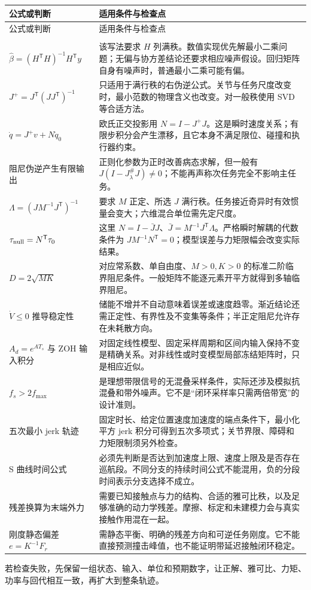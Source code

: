 \begingroup
\small
\begin{longtable}{>{\raggedright\arraybackslash}p{54mm}>{\raggedright\arraybackslash}p{100mm}}
\toprule 公式或判断 & 适用条件与检查点\\\midrule
\endfirsthead
\toprule 公式或判断 & 适用条件与检查点\\\midrule
\endhead
\midrule\multicolumn{2}{r}{接下页}\\\endfoot
\bottomrule\endlastfoot
$\hat\beta=(H^{\mathsf T}H)^{-1}H^{\mathsf T}y$ & 该写法要求 $H$ 列满秩。数值实现优先解最小二乘问题；无偏与协方差结论还要求相应噪声假设。回归矩阵自身有噪声时，普通最小二乘可能有偏。\\
$J^+=J^{\mathsf T}(JJ^{\mathsf T})^{-1}$ & 只适用于满行秩的右伪逆公式。关节与任务尺度改变时，最小范数的物理含义也改变。对一般秩使用 SVD 等合适方法。\\
$\dot q=J^+v+N\dot q_0$ & 欧氏正交投影用 $N=I-J^+J$。这是瞬时速度关系；有限步积分会产生漂移，且它本身不满足限位、碰撞和执行器约束。\\
阻尼伪逆产生有限输出 & 正则化参数为正时改善病态求解，但一般有 $J(I-J_\lambda^\#J)\ne0$；不能再声称次任务完全不影响主任务。\\
$\Lambda=(JM^{-1}J^{\mathsf T})^{-1}$ & 要求 $M$ 正定、所选 $J$ 满行秩。任务接近奇异时有效惯量会变大；六维混合单位需先定尺度。\\
$\tau_{\rm null}=N^{\mathsf T}\tau_0$ & 这里 $N=I-\bar JJ$、$\bar J=M^{-1}J^{\mathsf T}\Lambda$。严格瞬时解耦的代数条件为 $JM^{-1}N^{\mathsf T}=0$；模型误差与力矩限幅会改变实际结果。\\
$D=2\sqrt{MK}$ & 对应常系数、单自由度、$M>0,K>0$ 的标准二阶临界阻尼条件。一般矩阵不能逐元素开平方就得到多轴临界阻尼。\\
$\dot V\le0$ 推导稳定性 & 储能不增并不自动意味着误差或速度趋零。渐近结论还需正定性、有界性及不变集等条件；半正定阻尼允许存在未耗散方向。\\
$A_d=e^{AT_s}$ 与 ZOH 输入积分 & 对固定线性模型、固定采样周期和区间内输入保持不变是精确关系。对非线性或时变模型局部冻结矩阵时，只是相应近似。\\
$f_s>2f_{\max}$ & 是理想带限信号的无混叠采样条件，实际还涉及模拟抗混叠和带外噪声。它不是“闭环采样率只需两倍带宽”的设计准则。\\
五次最小 jerk 轨迹 & 固定时长、给定位置速度加速度的端点条件下，最小化平方 jerk 积分可得到五次多项式；关节界限、障碍和力矩限制须另外检查。\\
S 曲线时间公式 & 必须先判断是否达到加速度上限、速度上限及是否存在巡航段。不同分支的持续时间公式不能混用，负的分段时间表示分支选择不成立。\\
残差换算为末端外力 & 需要已知接触点与力的结构、合适的雅可比秩，以及足够准确的动力学残差。摩擦、标定和未建模力会与真实接触作用混在一起。\\
刚度静态偏差 $e=K^{-1}F_r$ & 需静态平衡、明确的残差方向和可逆任务刚度。它不能直接预测撞击峰值，也不能证明带延迟接触闭环稳定。\\
\end{longtable}
\endgroup

若检查失败，先保留一组状态、输入、单位和预期数字，让正解、雅可比、力矩、功率与回代相互一致，再扩大到整条轨迹。
